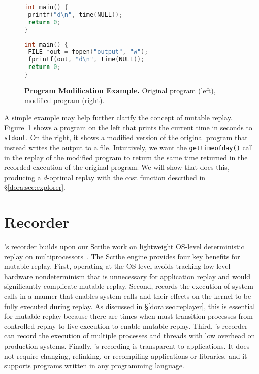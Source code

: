 \begin{figure}
\centering
\centering
\begin{minipage}{.4\textwidth}
  \begin{rbox}
\begin{lstlisting}[language=C]
int main() {
 printf("d\n", time(NULL));
 return 0;
}
\end{lstlisting}
  \end{rbox}
  \vspace{1em}
\end{minipage}
\hspace{1em}
\begin{minipage}{.4\textwidth}
  \begin{rbox}
\begin{lstlisting}[language=C]
int main() {
 FILE *out = fopen("output", "w");
 fprintf(out, "d\n", time(NULL));
 return 0;
}
\end{lstlisting}
  \end{rbox}
\end{minipage}
\caption{{\bf Program Modification Example.} Original program (left), modified program (right).}
\label{dora:fig:code-example}
\end{figure}


A simple example may help further clarify the concept of
mutable replay.  Figure~\ref{dora:fig:code-example} shows a program on the left that
prints the current time in seconds to {\tt stdout}. On the right, it
shows a modified version of the original program that instead writes the output to a file.
Intuitively, we want the {\tt gettimeofday()} call in the replay of the
modified program to return the same time returned in the recorded
execution of the original program.
We will show that {\dora} does this, producing a $d$-optimal replay
with the cost function described in \S\ref{dora:sec:explorer}. 

\section{Recorder}
\label{dora:sec:recorder}

{\dora}'s recorder builds upon our Scribe work on lightweight OS-level
deterministic replay on multiprocessors~\cite{scribe:sigmetrics10}.
The Scribe engine provides four key benefits for mutable replay. First, operating
at the OS level avoids tracking low-level hardware nondeterminism that
is unnecessary for application replay and would significantly
complicate mutable replay.  Second, {\dora} records the execution
of system calls in a manner that enables system calls and their effects
on the kernel to be fully executed during replay.  As discussed in
\S\ref{dora:sec:replayer}, this is essential for mutable replay
because there are times when {\dora} must transition processes
from controlled replay to live execution to enable mutable replay.
Third, {\dora}'s recorder can record the execution of multiple
processes and threads with low overhead on production systems. Finally,
{\dora}'s recording is transparent to applications.  It does not
require changing, relinking, or recompiling applications or libraries,
and it supports programs written in any programming language.

